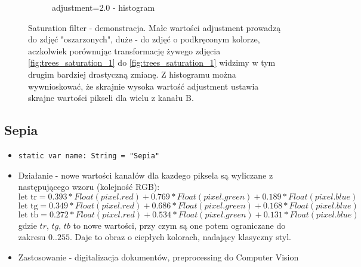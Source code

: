 \documentclass[a4paper]{article}
\begin{document}
\begin{figure}[H]
\begin{subfigure}{0.2\textwidth}
        \caption{adjustment=2.0 - histogram}
        \label{fig:trees_saturation_2}
    \end{subfigure}
    \caption{Saturation filter - demonstracja. Małe wartości adjustment prowadzą do zdjęć "oszarzonych", duże - do zdjęć o podkręconym kolorze, aczkolwiek porównując transformację żywego zdjęcia \ref{fig:trees_saturation_1} do \ref{fig:trees_saturation_1} widzimy w tym drugim bardziej drastyczną zmianę. Z histogramu można wywnioskować, że skrajnie wysoka wartość adjustment ustawia skrajne wartości pikseli dla wielu z kanału B.}
    \label{fig:posterize}
\end{figure}

\subsection{Sepia}

\begin{itemize}
    \item \texttt{static var name: String = "Sepia"}
    \item Działanie - nowe wartości kanałów dla kazdego piksela są wyliczane z następującego wzoru (kolejność RGB):
          \[
              \text{let tr} = 0.393 * Float(pixel.red) + 0.769 * Float(pixel.green) + 0.189 * Float(pixel.blue)
          \]
          \[
              \text{let tg} = 0.349 * Float(pixel.red) + 0.686 * Float(pixel.green) + 0.168 * Float(pixel.blue)
          \]
          \[
              \text{let tb} = 0.272 * Float(pixel.red) + 0.534 * Float(pixel.green) + 0.131 * Float(pixel.blue)
          \]
          gdzie $tr$, $tg$, $tb$ to nowe wartości, przy czym są one potem ograniczane do zakresu $0..255$. Daje to obraz o ciepłych kolorach, nadający klasyczny styl.
    \item Zastosowanie - digitalizacja dokumentów, preprocessing do Computer Vision
\end{itemize}
\end{document}

